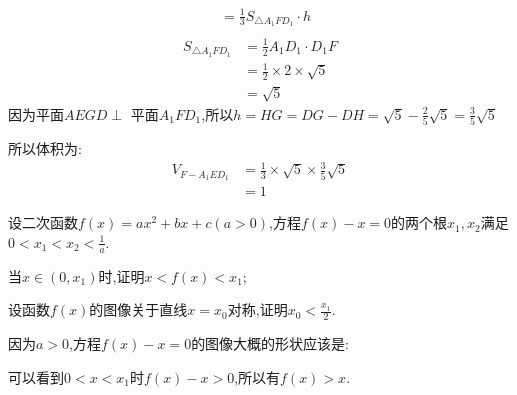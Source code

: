 \begin{questions}
\begin{solution}
\begin{penum}
\begin{align*}
				                    & = \frac13S_{\triangle{A_1FD_1}}\cdot h \\
			      \end{align*}
			      \begin{align*}
				      S_{\triangle{A_1FD_1}} & = \frac12A_1D_1\cdot D_1F          \\
				                             & = \frac12 \times 2 \times \sqrt{5} \\
				                             & = \sqrt{5}
			      \end{align*}
			      因为平面$AEGD \perp$ 平面$A_1FD_1$,所以$h=HG=DG - DH = \sqrt{5} - \frac25{\sqrt{5}} = \frac35\sqrt{5}$

			      所以体积为:
			      \begin{align*}
				      V_{F-A_1ED_1} & = \frac13 \times \sqrt{5} \times \frac35\sqrt{5} \\
				                    & = 1
			      \end{align*}
		\end{penum}
	\end{solution}

	\question 设二次函数$f(x)=ax^2+bx+c(a>0)$,方程$f(x) - x = 0$的两个根$x_1,x_2$满足$0<x_1<x_2<\frac1a$.
	\begin{penum}
		\item 当$x\in(0,x_1)$时,证明$x<f(x)<x_1$;
		\item 设函数$f(x)$的图像关于直线$x=x_0$对称,证明$x_0<\frac{x_1}{2}$.
	\end{penum}

	\begin{proofsolution}
		\begin{penum}
			\item 因为$a>0$,方程$f(x)-x=0$的图像大概的形状应该是:
			      \begin{center}
			      \end{center}
			      可以看到$0<x<x_1$时$f(x) -x > 0$,所以有$f(x) > x$.


\end{penum}
\end{proofsolution}
\end{questions}

